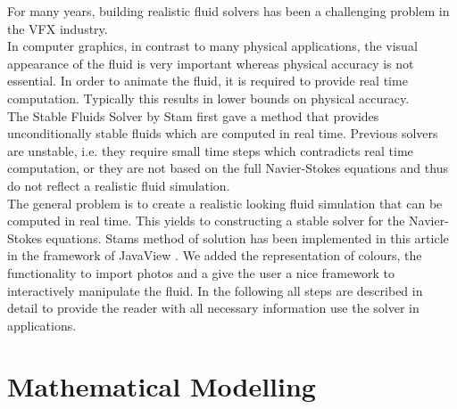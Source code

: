 \documentclass[a4paper,10pt,oneside,final,german,openbib,pdftex,titlepage]{scrbook}
\begin{document}
\nopagebreak
For many years, building realistic fluid solvers has been a challenging problem in the VFX industry.\\
In computer graphics, in contrast to many physical applications, the visual appearance of the fluid is very important whereas physical accuracy is not essential. In order to animate the fluid, it is required to provide real time computation. Typically this results in lower bounds on physical accuracy.\\

The Stable Fluids Solver by Stam \cite{Stam} first gave a method that provides unconditionally stable fluids which are computed in real time. Previous solvers are unstable, i.e. they require small time steps which contradicts real time computation, or they are not based on the full Navier-Stokes equations and thus do not reflect a realistic fluid simulation.\\

The general problem is to create a realistic looking fluid simulation that can be computed in real time. This yields to constructing a stable solver for the Navier-Stokes equations. Stams method of solution has been implemented in this article in the framework of JavaView \cite{JavaView}. We added the representation of colours, the functionality to import photos and a give the user a nice framework to interactively manipulate the fluid. In the following all steps are described in detail to provide the reader with all necessary information use the solver in applications.\\
 
\chapter{Mathematical Modelling} \label{Section:Mathematical Modelling} \label{chapter:Math}
\end{document}
